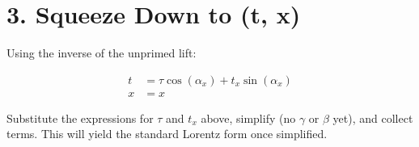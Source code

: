 \documentclass[12pt]{article}
\begin{document}
\section*{3. Squeeze Down to (t, x)}

Using the inverse of the unprimed lift:

\[
\begin{aligned}
t &= \tau \cos(\alpha_x) + t_x \sin(\alpha_x) \\
x &= x
\end{aligned}
\]

Substitute the expressions for $\tau$ and $t_x$ above, simplify (no $\gamma$ or $\beta$ yet), and collect terms. This will yield the standard Lorentz form once simplified.
\end{document}
